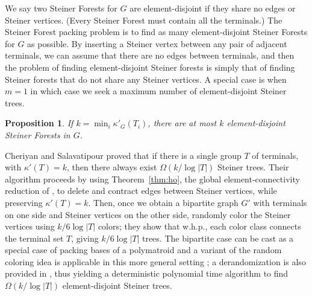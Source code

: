 \documentclass[11pt]{article}
\newtheorem{prop}[lemma]{Proposition}
\newcommand{\elconn}{\kappa'}
\renewenvironment{proof}{\vspace{-0.1in}\noindent{\bf Proof:}}{\hspace*{\fill}$\Box$\par}
\begin{document}
We say two Steiner Forests for $G$ are element-disjoint if they share
no edges or Steiner vertices. (Every Steiner Forest must contain all
the terminals.) The Steiner Forest packing problem is to find as many
element-disjoint Steiner Forests for $G$ as possible. By inserting a
Steiner vertex between any pair of adjacent terminals, we can assume
that there are no edges between terminals, and then the problem of
finding element-disjoint Steiner forests is simply that of finding
Steiner forests that do not share any Steiner vertices. A special case
is when $m=1$ in which case we seek a maximum number of element-disjoint
Steiner trees.

\begin{prop} If $k = \min_i \elconn_G(T_i)$, there are at most $k$
  element-disjoint Steiner Forests in $G$.
\end{prop}
\iffalse
\vspace{0.05in}
\begin{proof}
  Let $S$ be a set of $k$ white vertices that separates vertices $u$
  and $v$ in $T_i$. Any tree that contains both $u$ and $v$ must
  contain a vertex of $S$. Hence, we can pack at most $k$
  trees that contain all of $T_i$.\end{proof}
\fi

Cheriyan and Salavatipour \cite{cs} proved that if there is a single
group $T$ of terminals, with $\elconn(T) = k$, then there always exist
$\Omega(k / \log |T|)$ Steiner trees. Their algorithm proceeds by
using Theorem~\ref{thm:ho}, the global element-connectivity reduction
of \cite{hind}, to delete and contract edges between Steiner vertices,
while preserving $\elconn(T) = k$. Then, once we obtain a bipartite
graph $G'$ with terminals on one side and Steiner vertices on the
other side, randomly color the Steiner vertices using $k/6 \log |T|$
colors; they show that w.h.p., each color class connects the terminal
set $T$, giving $k/ 6 \log |T|$ trees. The bipartite case can be cast
as a special case of packing bases of a polymatroid and a variant of
the random coloring idea is applicable in this more general setting
\cite{CalinescuCV07}; a derandomization is also provided in
\cite{CalinescuCV07}, thus yielding a deterministic polynomial time
algorithm to find $\Omega(k/\log |T|)$ element-disjoint Steiner trees.

\iffalse
 (a
polymatroid is an integer-valued monotone submodular set function $f$
with $f(\emptyset) = 0$).  For the Steiner Tree packing problem, in
the bipartite graph $G'(T \cup W, E)$, for any $W' \subseteq W$ of
Steiner vertices, let $c(W')$ be the number of components that contain
terminals in $G'[T \cup W']$, the graph induced by $T \cup W'$. We
define $f(W') = |T| - c(W')$; a set of Steiner vertices $W'$ is a base
if $f(W') = f(W) = |T| - 1$. It is easy to see that $f$ is a
polymatroid, and the problem of packing bases of $f$ is equivalent to
packing element-disjoint Steiner Trees. Therefore, since
\cite{CalinescuCV07} describes a derandomization of the
random-coloring algorithm, we have a deterministic algorithm to pack
element-disjoint Steiner Trees.
\fi
\end{document}
